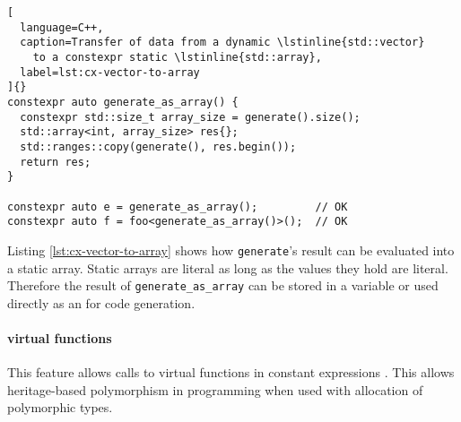 \documentclass[../main]{subfiles}
\begin{document}
\begin{lstlisting}[
  language=C++,
  caption=Transfer of data from a dynamic \lstinline{std::vector}
    to a constexpr static \lstinline{std::array},
  label=lst:cx-vector-to-array
]{}
constexpr auto generate_as_array() {
  constexpr std::size_t array_size = generate().size();
  std::array<int, array_size> res{};
  std::ranges::copy(generate(), res.begin());
  return res;
}

constexpr auto e = generate_as_array();         // OK
constexpr auto f = foo<generate_as_array()>();  // OK
\end{lstlisting}

Listing \ref{lst:cx-vector-to-array} shows how \lstinline{generate}'s result
can be evaluated into a static array. Static arrays are literal as long
as the values they hold are literal. Therefore the result of
\lstinline{generate_as_array} can be stored in a \constexpr variable or used
directly as an \nttp for code generation.

\paragraph{
  \constexpr virtual functions
}

This feature allows calls to virtual functions in constant expressions
\cite{virtual-constexpr}. This allows heritage-based polymorphism in \constexpr
programming when used with \constexpr allocation of polymorphic types.

%
%

\end{document}
